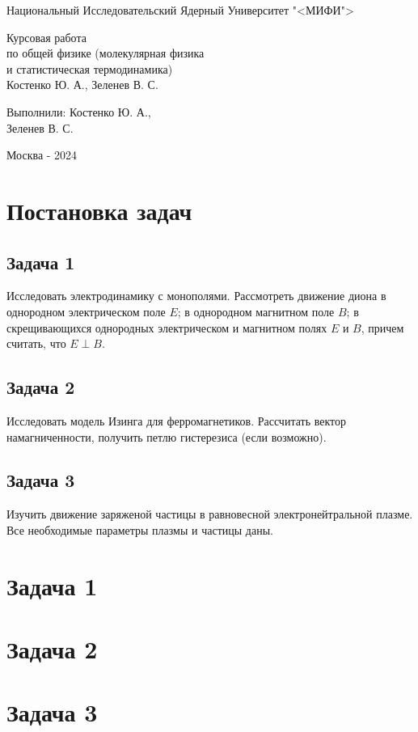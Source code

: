 \documentclass[oneside,final,14pt]{extarticle}
\begin{document}
\begin{titlepage}
\centerline{Национальный Исследовательский Ядерный Университет "<МИФИ">}
\vfill
\Large
\begin{center}
Курсовая работа\\ по общей физике (молекулярная физика\\и статистическая термодинамика) \\ Костенко Ю. А., Зеленев В. С.
\end{center}
\normalsize
\vfill
\begin{flushright}
Выполнили: Костенко Ю. А., \\ Зеленев В. С.
\end{flushright}
\vfill \vfill \vfill
\centerline{Москва - 2024}
\end{titlepage}
\setcounter{page}{2}
\tableofcontents
\newpage

\section{Постановка задач}
\subsection{Задача 1}
Исследовать электродинамику с монополями. Рассмотреть движение диона в однородном электрическом поле $E$; в однородном магнитном поле $B$; в скрещивающихся однородных электрическом и магнитном полях $E$ и $B$, причем считать, что $E \perp B$.
\subsection{Задача 2}
Исследовать модель Изинга для ферромагнетиков. Рассчитать вектор намагниченности, получить петлю гистерезиса (если возможно). 
\subsection{Задача 3}
Изучить движение заряженой частицы в равновесной электронейтральной плазме. Все необходимые параметры плазмы и частицы даны. 
\newpage

\section{Задача 1}

\newpage

\section{Задача 2}

\newpage

\section{Задача 3}
\end{document}
